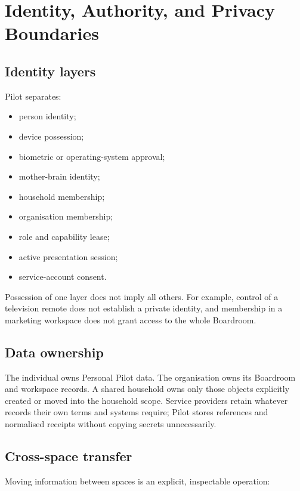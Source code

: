 \documentclass[11pt,a4paper]{article}
\begin{document}
\section{Identity, Authority, and Privacy Boundaries}

\subsection{Identity layers}

Pilot separates:

\begin{itemize}[leftmargin=*]
  \item person identity;
  \item device possession;
  \item biometric or operating-system approval;
  \item mother-brain identity;
  \item household membership;
  \item organisation membership;
  \item role and capability lease;
  \item active presentation session;
  \item service-account consent.
\end{itemize}

Possession of one layer does not imply all others.  For example, control of a
television remote does not establish a private identity, and membership in a
marketing workspace does not grant access to the whole Boardroom.

\subsection{Data ownership}

The individual owns Personal Pilot data.  The organisation owns its Boardroom
and workspace records.  A shared household owns only those objects explicitly
created or moved into the household scope.  Service providers retain whatever
records their own terms and systems require; Pilot stores references and
normalised receipts without copying secrets unnecessarily.

\subsection{Cross-space transfer}

Moving information between spaces is an explicit, inspectable operation:
\end{document}
